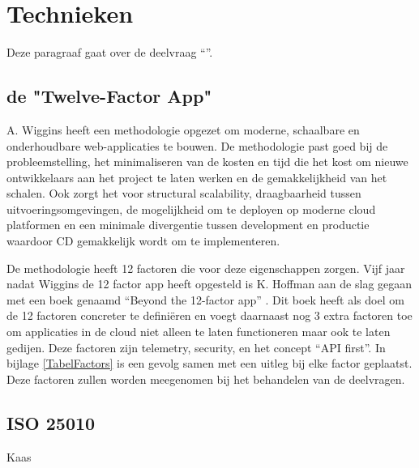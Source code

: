 \chapter{Technieken}

\label{Chapter3}

Deze paragraaf gaat over de deelvraag \enquote{\deeltechnieken}.

\section{de "Twelve-Factor App"}

A. Wiggins \parencite{12Factor} heeft een methodologie opgezet om moderne, schaalbare en onderhoudbare web-applicaties te bouwen. De methodologie past goed bij de probleemstelling, het minimaliseren van de kosten en tijd die het kost om nieuwe ontwikkelaars aan het project te laten werken en de gemakkelijkheid van het schalen. Ook zorgt het voor structural scalability, draagbaarheid tussen uitvoeringsomgevingen, de mogelijkheid om te deployen op moderne cloud platformen en een minimale divergentie tussen development en productie waardoor CD gemakkelijk wordt om te implementeren.

De methodologie heeft 12 factoren die voor deze eigenschappen zorgen. Vijf jaar nadat Wiggins de 12 factor app heeft opgesteld is K. Hoffman aan de slag gegaan met een boek genaamd \enquote{Beyond the 12-factor app} \parencite{Beyond12Factor}. Dit boek heeft als doel om de 12 factoren concreter te definiëren en voegt daarnaast nog 3 extra factoren toe om applicaties in de cloud niet alleen te laten functioneren maar ook te laten gedijen. Deze factoren zijn telemetry, security, en het concept \enquote{API first}. In bijlage \ref{TabelFactors} is een gevolg samen met een uitleg bij elke factor geplaatst. Deze factoren zullen worden meegenomen bij het behandelen van de deelvragen.

\section{ISO 25010}

Kaas